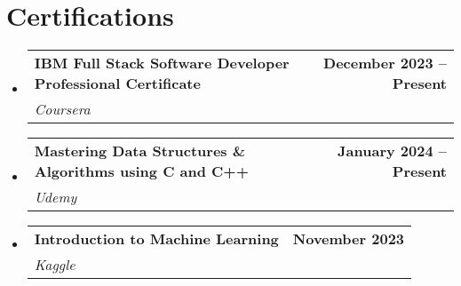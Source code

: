 \documentclass[letterpaper,11pt]{article}
\makeatletter
\newcommand{\resumeSubheading}[4]{
  \vspace{-2pt}\item
    \begin{tabular*}{1.0\textwidth}[t]{l@{\extracolsep{\fill}}r}
      \textbf{#1} & \textbf{\small #2} \\
      \textit{\small#3} & \textit{\small #4} \\
    \end{tabular*}\vspace{-7pt}
}
\newcommand{\resumeSubHeadingListStart}{\begin{itemize}[leftmargin=0.0in, label={}]}
\newcommand{\resumeSubHeadingListEnd}{\end{itemize}}
\makeatother
\begin{document}
\section{Certifications}
    \resumeSubHeadingListStart
        \resumeSubheading{IBM Full Stack Software Developer Professional Certificate}{December 2023 -- Present}{Coursera}{}
        \resumeSubheading{Mastering Data Structures \& Algorithms using C and C++}{January 2024 -- Present}{Udemy}{}
        \resumeSubheading{Introduction to Machine Learning}{November 2023}{Kaggle}{}
    \resumeSubHeadingListEnd
\end{document}
